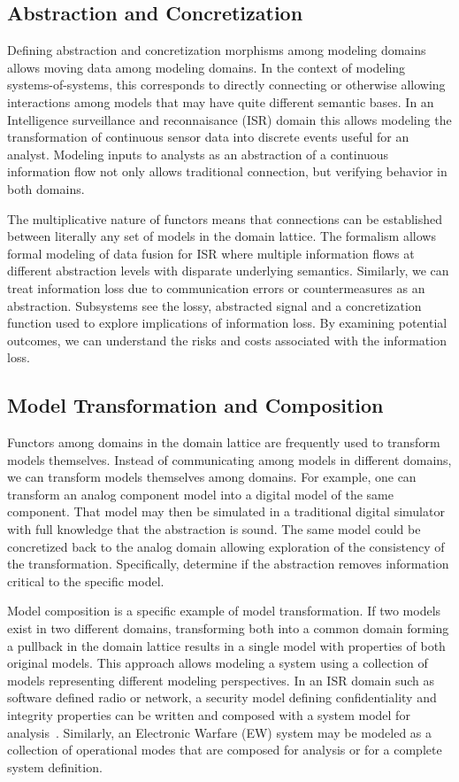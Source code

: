 \documentclass[12pt]{article}
\begin{document}
\subsection{Abstraction and Concretization}

Defining abstraction and concretization morphisms among modeling
domains allows moving data among modeling domains.  In the context of
modeling systems-of-systems, this corresponds to directly connecting
or otherwise allowing interactions among models that may have quite
different semantic bases.  In an Intelligence surveillance and
reconnaisance (ISR) domain this allows modeling the transformation of
continuous sensor data into discrete events useful for an analyst.
Modeling inputs to analysts as an abstraction of a continuous
information flow not only allows traditional connection, but verifying
behavior in both domains.

The multiplicative nature of functors means that connections can be
established between literally any set of models in the domain lattice.
The formalism allows formal modeling of data fusion for ISR where
multiple information flows at different abstraction levels with
disparate underlying semantics.  Similarly, we can treat information
loss due to communication errors or countermeasures as an abstraction.
Subsystems see the lossy, abstracted signal and a concretization
function used to explore implications of information loss.  By
examining potential outcomes, we can understand the risks and costs
associated with the information loss.

\subsection{Model Transformation and Composition}

Functors among domains in the domain lattice are frequently used to
transform models themselves.  Instead of communicating among models in
different domains, we can transform models themselves among domains.
For example, one can transform an analog component model into a
digital model of the same component.  That model may then be simulated
in a traditional digital simulator with full knowledge that the
abstraction is sound.  The same model could be concretized back to the
analog domain allowing exploration of the consistency of the
transformation.  Specifically, determine if the abstraction removes
information critical to the specific model.

Model composition is a specific example of model transformation.  If
two models exist in two different domains, transforming both into a
common domain forming a pullback in the domain lattice results in a
single model with properties of both original models.  This approach
allows modeling a system using a collection of models representing
different modeling perspectives. In an ISR domain such as software
defined radio or network, a security model defining confidentiality
and integrity properties can be written and composed with a system
model for analysis~\cite{Kimmell:08:System-Synthesi}.  Similarly, an
Electronic Warfare (EW)
system may be modeled as a collection of operational modes that are
composed for analysis or for a complete system definition.
\end{document}
